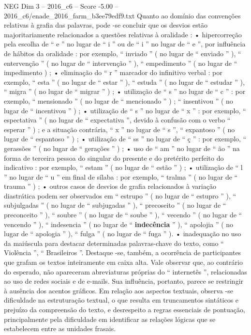 \begin{textsample}{NEG Dim 3 – 2016\_c6 – Score -5.00 – 2016\_c6/enade\_2016\_farm\_b3ee79edf9.txt}
Quanto ao domínio das convenções relativas à grafia das palavras, pode -se concluir que os desvios estão majoritariamente relacionados a questões relativas à oralidade : • hipercorreção pela escolha de “ e ” no lugar de “ i ” ou de “ i ” no lugar de “ e ”, por influência de hábitos da oralidade : por exemplo, “ inviado ” ( no lugar de “ enviado ” ), “ entervenção ” ( no lugar de “ intervenção ” ), “ empedimento ” ( no lugar de “ impedimento ) ; • eliminação do “ r ” marcador do infinitivo verbal : por exemplo, “ esta ” ( no lugar de “ estar ” ), “ estuda ” ( no lugar de “ estudar ” ), “ migra ” ( no lugar de “ migrar ” ) ; • utilização de “ s ” no lugar de “ c ” : por exemplo, “ mensionado ” ( no lugar de “ mencionado ” ) ; “ insentivou ” ( no lugar de “ incentivou ” ) ; • utilização de “ s ” no lugar de “ x ” : por exemplo, “ espectativa ” ( no lugar de “ expectativa ”, devido à confusão com o verbo “ esperar ” ) ; e a situação contrária, “ x ” no lugar de “ s ”, “ expantoso ” ( no lugar de “ espantoso ” ) ; • utilização de “ ss ” no lugar de “ ç ” : por exemplo, “ gerassões ” ( no lugar de “ gerações ” ) ; • uso de “ am ” no lugar de “ ão ” na forma de terceira pessoa do singular do presente e do pretérito perfeito do indicativo : por exemplo, “ estam ” ( no lugar de “ estão ” ) ; • utilização de “ l ” no lugar de “ u ” em final de sílaba : por exemplo, “ tralma ” ( no lugar de “ trauma ” ) ; • outros casos de desvios de grafia relacionados à variação diastrática podem ser observados em “ estrupo ” ( no lugar de “ estupro ” ), “ subjulgadas ” ( no lugar de “ subjugadas ” ), “ precoseito ” ( no lugar de “ preconceito ” ), “ soubre ” ( no lugar de “ soube ” ), “ vecendo ” ( no lugar de “ vencendo ” ), “ indesencia ” ( no lugar de “ \textbf{indecência} ” ), “ apolojia ” ( no lugar de “ apologia ” ), “ fulga ” ( no lugar de “ fuga ” ). • inadequação no uso da maiúscula para destacar determinadas palavras-chave do texto, como “ Violência ”, “ Brasileiros ”.
Destaque -se, também, a ocorrência de participantes que grafam os textos inteiramente em caixa alta.
Vale observar que, ao contrário do esperado, não apareceram abreviaturas próprias do “ internetês ”, relacionadas ao uso de redes sociais e de e-mails.
Sua influência, portanto, parece se restringir à ausência dos acentos gráficos.
Em relação aos aspectos textuais, observa -se dificuldade na estruturação textual, o que resulta em truncamentos sintáticos e prejuízo da compreensão do texto, e desrespeito a regras essenciais de pontuação, principalmente pela dificuldade em identificar as relações lógicas que se estabelecem entre as unidades frasais.

\end{textsample}
